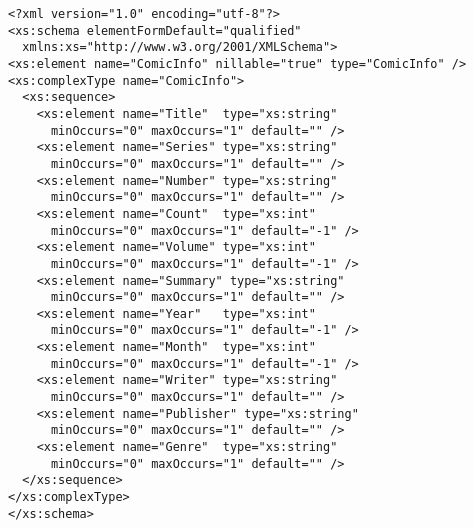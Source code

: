 \documentclass[../../../thesis]{subfiles}
\begin{document}
\begin{appendices}
\begin{verbatim}
<?xml version="1.0" encoding="utf-8"?>
<xs:schema elementFormDefault="qualified"
  xmlns:xs="http://www.w3.org/2001/XMLSchema">
<xs:element name="ComicInfo" nillable="true" type="ComicInfo" />
<xs:complexType name="ComicInfo">
  <xs:sequence>
    <xs:element name="Title"  type="xs:string"
      minOccurs="0" maxOccurs="1" default="" />
    <xs:element name="Series" type="xs:string"
      minOccurs="0" maxOccurs="1" default="" />
    <xs:element name="Number" type="xs:string"
      minOccurs="0" maxOccurs="1" default="" />
    <xs:element name="Count"  type="xs:int"
      minOccurs="0" maxOccurs="1" default="-1" />
    <xs:element name="Volume" type="xs:int"
      minOccurs="0" maxOccurs="1" default="-1" />
    <xs:element name="Summary" type="xs:string"
      minOccurs="0" maxOccurs="1" default="" />
    <xs:element name="Year"   type="xs:int"
      minOccurs="0" maxOccurs="1" default="-1" />
    <xs:element name="Month"  type="xs:int"
      minOccurs="0" maxOccurs="1" default="-1" />
    <xs:element name="Writer" type="xs:string"
      minOccurs="0" maxOccurs="1" default="" />
    <xs:element name="Publisher" type="xs:string"
      minOccurs="0" maxOccurs="1" default="" />
    <xs:element name="Genre"  type="xs:string"
      minOccurs="0" maxOccurs="1" default="" />
  </xs:sequence>
</xs:complexType>
</xs:schema>
\end{verbatim}

\end{appendices}
\end{document}
